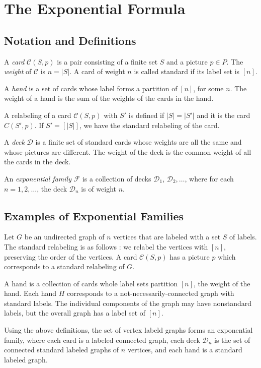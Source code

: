 \documentclass[11pt]{article}
\renewcommand{\>}{\rangle}
\newcommand{\<}{\langle}
\let \mc \mathcal
\begin{document}
 \section{The Exponential Formula}
 \subsection{Notation and Definitions}
 \begin{definition} A \textit{card} $\mc C(S, p)$ is a pair consisting of a finite set $S$ and a picture $p \in P$.  The \textit{weight} of $\mc C$ is $n = |S|$.  A card of weight $n$ is called standard if its label set is $[n]$.
 \end{definition}
 \begin{definition} A \textit{hand} is a set of cards whose label forms a partition of $[n]$, for some $n$.  The weight of a hand is the sum of the weights of the cards in the hand.  
 \end{definition}
 \begin{definition} A relabeling of a card $\mc C(S, p)$ with $S'$ is defined if $|S| = |S'|$ and it is the card $C(S', p)$.  If $S' = [|S|]$, we have the standard relabeling of the card.
 \end{definition}
 \begin{definition} A \textit{deck} $\mc D$ is a finite set of standard cards whose weights are all the same and whose pictures are different.  The weight of the deck is the common weight of all the cards in the deck.
 \end{definition} 
 
 \begin{definition} 
 An \textit{exponential family} $\mc F$ is a collection of decks $\mc D_1$, $\mc D_2, \dots$, where for each $n = 1, 2, \dots$, the deck $\mc D_n$ is of weight $n$.
\end{definition}
\subsection{Examples of Exponential Families}
\begin{example}[Undirected Graphs $\mc F_1$] Let $G$ be an undirected graph of $n$ vertices that are labeled with a set $S$ of labels.  The standard relabeling is as follows : we relabel the vertices with $[n]$, preserving the order of the vertices.  A card $\mc C(S, p)$ has a picture $p$ which corresponds to a standard relabeling of $G$.

A hand is a collection of cards whole label sets partition $[n]$, the weight of the hand.  Each hand $H$ corresponds to a not-necessarily-connected graph with standard labels.  The individual components of the graph may have nonstandard labels, but the overall graph has a label set of $[n]$.

Using the above definitions, the set of vertex labeld graphs forms an exponential family, where each card is a labeled connected graph, each deck $\mc D_n$ is the set of connected standard labeled graphs of $n$ vertices, and each hand is a standard labeled graph.  
\end{example}
\end{document}
